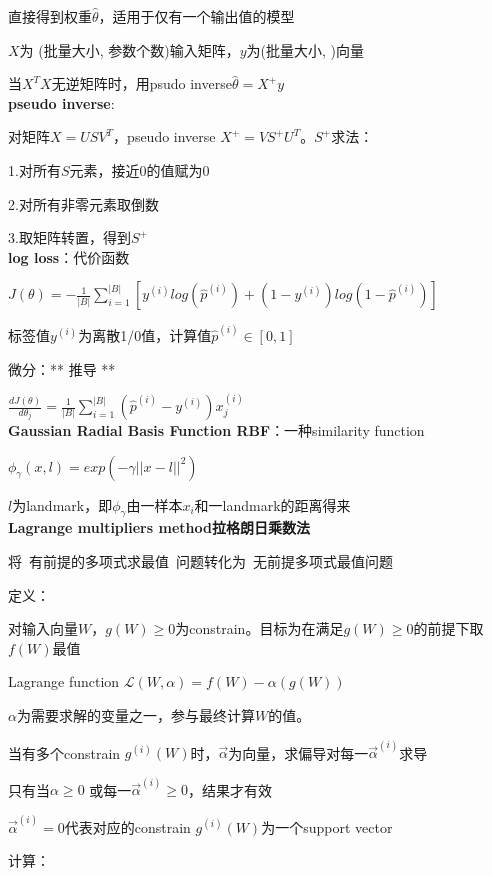 \documentclass[UTF8]{ctexart}
\begin{document}
  直接得到权重$\hat{\theta}$，适用于仅有一个输出值的模型

  $X$为 (批量大小, 参数个数)输入矩阵，$y$为(批量大小, )向量
  
  当$X^TX$无逆矩阵时，用psudo inverse$\hat{\theta} = X^+y$\\
\textbf{pseudo inverse}:

  对矩阵$X=USV^T$，pseudo inverse $X^+=VS^+U^T$。$S^+$求法：

  \quad 1.对所有$S$元素，接近0的值赋为0

  \quad 2.对所有非零元素取倒数

  \quad 3.取矩阵转置，得到$S^+$\\
\textbf{log loss}：代价函数

  $J(\theta) = -\frac{1}{|B|}\sum_{i=1}^{|B|}[y^{(i)}log(\hat{p}^{(i)}) + (1-y^{(i)})log(1-\hat{p}^{(i)})]$

  标签值$y^{(i)}$为离散1/0值，计算值$\hat{p}^{(i)} \in [0,1]$

  微分：** 推导 **
  
  \quad $\frac{d J(\theta)}{d \theta_j} = \frac{1}{|B|}\sum_{i=1}^{|B|}(\hat{p}^{(i)} - y^{(i)}) x_j^{(i)}$\\
\textbf{Gaussian Radial Basis Function RBF}：一种similarity function

  $\phi_{\gamma}(x, l) = exp(-\gamma||x-l||^2)$

  \quad $l$为landmark，即$\phi_{\gamma}$由一样本$x_i$和一landmark的距离得来\\
\textbf{Lagrange multipliers method拉格朗日乘数法}

  将\ 有前提的多项式求最值\ 问题转化为\ 无前提多项式最值问题

  定义：

  \quad 对输入向量$W$，$g(W) \geq 0$为constrain。目标为在满足$g(W) \geq 0$的前提下取$f(W)$最值

  \quad Lagrange function $\mathcal{L} (W, \alpha) = f(W) - \alpha(g(W))$

  \quad \quad $\alpha$为需要求解的变量之一，参与最终计算$W$的值。

  \quad \quad 当有多个constrain $g^{(i)}(W)$时，$\vec{\alpha}$为向量，求偏导对每一$\vec{\alpha}^{(i)}$求导

  \quad \quad 只有当$\alpha \geq 0$ 或每一$\vec{\alpha}^{(i)} \geq 0$，结果才有效

  \quad \quad $\vec{\alpha}^{(i)} = 0$代表对应的constrain $g^{(i)}(W)$为一个support vector

  计算：
  
\end{document}
